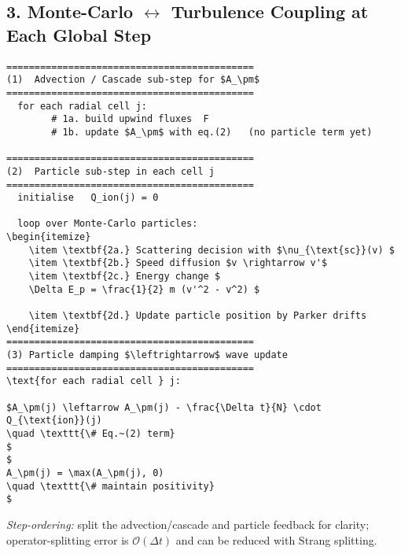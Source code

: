 \begin{tcolorbox}[colframe=black, colback=white, title=Step-by-Step Coupling Scheme]

\section*{3. Monte-Carlo \(\leftrightarrow\) Turbulence Coupling at Each Global Step}

\begin{lstlisting}[mathescape=true]
============================================
(1)  Advection / Cascade sub-step for $A_\pm$
============================================
  for each radial cell j:
        # 1a. build upwind fluxes  F
        # 1b. update $A_\pm$ with eq.(2)   (no particle term yet)

============================================
(2)  Particle sub-step in each cell j
============================================
  initialise   Q_ion(j) = 0

  loop over Monte-Carlo particles:
\begin{itemize}
    \item \textbf{2a.} Scattering decision with $\nu_{\text{sc}}(v) $
    \item \textbf{2b.} Speed diffusion $v \rightarrow v'$
    \item \textbf{2c.} Energy change $
    \Delta E_p = \frac{1}{2} m (v'^2 - v^2) $
    
    \item \textbf{2d.} Update particle position by Parker drifts
\end{itemize}
============================================
(3) Particle damping $\leftrightarrow$ wave update
============================================
\text{for each radial cell } j:

$A_\pm(j) \leftarrow A_\pm(j) - \frac{\Delta t}{N} \cdot Q_{\text{ion}}(j) 
\quad \texttt{\# Eq.~(2) term}
$
$
A_\pm(j) = \max(A_\pm(j), 0) 
\quad \texttt{\# maintain positivity}
$
\end{lstlisting}

\emph{Step-ordering:} split the advection/cascade and particle feedback for clarity; operator-splitting error is \( \mathcal{O}(\Delta t) \) and can be reduced with Strang splitting.

\end{tcolorbox}
